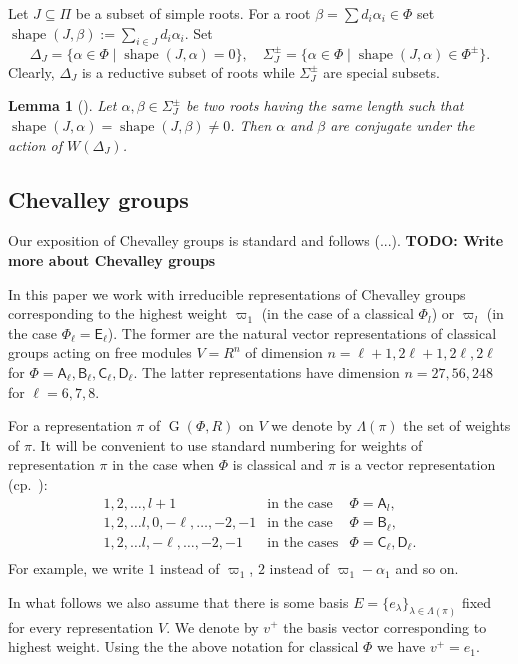 \documentclass[12pt]{amsart}
\numberwithin{equation}{section}
\newtheorem{lemma}[lemmacounter]{Lemma}
\theoremstyle{definition}
\DeclareMathOperator{\G}{G}
\DeclareMathOperator{\shape}{shape}
\newcommand{\rA}{\mathsf{A}}
\newcommand{\rB}{\mathsf{B}}
\newcommand{\rC}{\mathsf{C}}
\newcommand{\rD}{\mathsf{D}}
\newcommand{\rE}{\mathsf{E}}
\begin{document}
Let $J\subseteq \Pi$ be a subset of simple roots. 
For a root $\beta = \sum d_i\alpha_i \in \Phi$ set $\shape(J, \beta):=\sum\limits_{i\in J}d_i \alpha_i$.
Set $$\Delta_J = \{\alpha \in \Phi \mid \shape(J, \alpha)=0\},\quad \Sigma^\pm_J = \{\alpha \in \Phi \mid \shape(J, \alpha)\in\Phi^\pm \}.$$
Clearly, $\Delta_J$ is a reductive subset of roots while $\Sigma^\pm_J$ are special subsets.

\begin{lemma}[{\cite[Lemma~1]{ABS}}]\label{lemma:abs}
Let $\alpha, \beta \in \Sigma^\pm_J$ be two roots having the same length such that $\shape(J,\alpha)=\shape(J,\beta)\neq 0$.
Then $\alpha$ and $\beta$ are conjugate under the action of $W(\Delta_J)$.
\end{lemma}

\subsection{Chevalley groups}
Our exposition of Chevalley groups is standard and follows (...).
\textbf{TODO: Write more about Chevalley groups}

In this paper we work with irreducible representations of Chevalley groups corresponding to the highest weight
$\varpi_1$ (in the case of a classical $\Phi_l$) or $\varpi_l$ (in the case $\Phi_\ell=\rE_\ell$). 
The former are the natural vector representations of classical groups acting on free modules $V=R^n$ of dimension 
$n=\ell+1, 2\ell+1, 2\ell,2\ell$ for $\Phi=\rA_\ell,\rB_\ell,\rC_\ell,\rD_\ell$.
The latter representations have dimension $n=27, 56, 248$ for $\ell=6,7,8$.

For a representation $\pi$ of $\G(\Phi, R)$ on $V$ we denote by $\Lambda(\pi)$ the set of weights of $\pi$.
It will be convenient to use standard numbering for weights of representation $\pi$ in the case when $\Phi$ is classical and $\pi$ is a vector representation (cp.~\cite[§1B]{St78}):
$$\begin{array}{cll}
  1,2,\ldots, l+1 & \text{in the case} & \Phi =\rA_l, \\
  1,2,\ldots l, 0, -\ell,\ldots, -2, -1 & \text{in the case} & \Phi =\rB_\ell, \\
  1,2,\ldots l, -\ell,\ldots, -2, -1 & \text{in the cases}   & \Phi =\rC_\ell, \rD_\ell. \\
\end{array}$$
For example, we write $1$ instead of $\varpi_1$, $2$ instead of $\varpi_1-\alpha_1$ and so on.

In what follows we also assume that there is some basis $E=\{e_\lambda\}_{\lambda\in\Lambda(\pi)}$ fixed for every representation $V$.
We denote by $v^+$ the basis vector corresponding to highest weight. 
Using the the above notation for classical $\Phi$ we have $v^+=e_1$.
\end{document}
